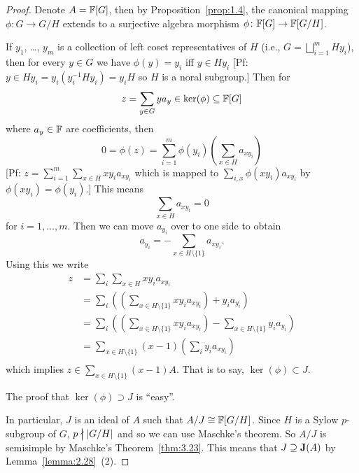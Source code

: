 \begin{proof}
Denote $A=\mathbb{F}[G]$, then by Proposition~\ref{prop:1.4}, the canonical
mapping $\phi\colon G\to G/H$
extends to a surjective algebra morphism $\phi\colon\mathbb{F}[G]\to\mathbb{F}[G/H]$.

If $y_{1}$, \dots, $y_{m}$ is a collection of left coset
representatives of $H$ (i.e., $G=\bigsqcup^{m}_{i=1}Hy_{i}$), then for
every $y\in G$ we have $\phi(y)=y_{i}$ iff $y\in Hy_{i}$
[Pf: $y\in Hy_{i}=y_{i}(y_{i}^{-1}Hy_{i})=y_{i}H$ so $H$ is a noral subgroup.]
Then for
\begin{equation}
z=\sum_{y\in G}ya_{y}\in\ker(\phi)\subseteq\mathbb{F}[G]
\end{equation}
where $a_{y}\in\mathbb{F}$ are coefficients, then
\begin{equation}
0=\phi(z)=\sum^{m}_{i=1}\phi(y_{i})\left(\sum_{x\in H}a_{xy_{i}}\right)
\end{equation}
[Pf: $z=\sum^{m}_{i=1}\sum_{x\in H}xy_{i}a_{xy_{i}}$ which is mapped
  to $\sum_{i,x}\phi(xy_{i})a_{xy_{i}}$ by $\phi(xy_{i})=\phi(y_{i})$.]
This means
\begin{equation}
\sum_{x\in H}a_{xy_{i}}=0
\end{equation}
for $i=1,\dots,m$. Then we can move $a_{y_{i}}$ over to one side to
obtain
\begin{equation}
a_{y_{i}}=-\sum_{x\in H\setminus\{1\}}a_{xy_{i}}.
\end{equation}
Using this we write
\begin{subequations}
  \begin{align}
z &=\sum_{i}\sum_{x\in H}xy_{i}a_{xy_{i}}\\
&=\sum_{i}\left(\left(\sum_{x\in H\setminus\{1\}}xy_{i}a_{xy_{i}}\right)+y_{i}a_{y_{i}}\right)\\
&=\sum_{i}\left(\left(\sum_{x\in H\setminus\{1\}}xy_{i}a_{xy_{i}}\right)-\sum_{x\in H\setminus\{1\}}y_{i}a_{y_{i}}\right)\\
&=\sum_{x\in H\setminus\{1\}}(x-1)\left(\sum_{i}y_{i}a_{xy_{i}}\right)\\
  \end{align}
\end{subequations}
which implies $z\in\sum_{x\in H\setminus\{1\}}(x-1)A$. That is to say,
$\ker(\phi)\subset J$.

The proof that $\ker(\phi)\supset J$ is ``easy''.

In particular, $J$ is an ideal of $A$ such that
$A/J\cong\mathbb{F}[G/H]$. Since $H$ is a Sylow $p$-subgroup of $G$,
$p\ndivides|G/H|$ and so we can use Maschke's theorem. So $A/J$ is
semisimple by Maschke's Theorem~\ref{thm:3.23}. This means that
$J\supseteq\operatorname{\textup{\textbf{J}}}(A)$ by Lemma~\ref{lemma:2.28}~(2).


\end{proof}
